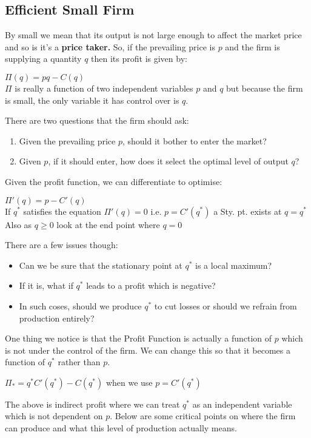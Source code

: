 \documentclass[12pt, letterpaper]{article}
\begin{document}
\subsection{Efficient Small Firm}
By small we mean that its output is not large enough to affect the market price and so is it's a \textbf{price taker.} So, if the prevailing price is $p$ and the firm is supplying a quantity $q$ then its profit is given by:
\begin{center}
	$\Pi(q) = pq - C(q)$\\
	$\Pi$ is really a function of two independent variables $p$ and $q$ but because the firm is small, the only variable it has control over is $q$.
\end{center}
There are two questions that the firm should ask:
\begin{enumerate}
	\item Given the prevailing price $p$, should it bother to enter the market?
	\item Given $p$, if it should enter, how does it select the optimal level of output $q$?
\end{enumerate}
Given the profit function, we can differentiate to optimise:
\begin{center}
	$\Pi'(q) = p - C'(q)$\\
	If $q^*$ satisfies the equation $\Pi'(q)=0$ i.e. $p=C'(q^*)$ a Sty. pt. exists at $q=q^*$\\
	Also as $q \geq0$ look at the end point where $q=0$
\end{center}
There are a few issues though:
\begin{itemize}
	\item Can we be sure that the stationary point at $q^*$ is a local maximum?
	\item If it is, what if $q^*$ leads to a profit which is negative?
	\item In such coses, should we produce $q^*$ to cut losses or should we refrain from production entirely?
\end{itemize}
One thing we notice is that the Profit Function is actually a function of $p$ which is not under the control of the firm. We can change this so that it becomes a function of $q^*$ rather than $p$.
\begin{center}
	$\Pi_* = q^*C'(q^*)-C(q^*)$ when we use $p=C'(q^*)$
\end{center}
The above is indirect profit where we can treat $q^*$ as an independent variable which is not dependent on $p$. Below are some critical points on where the firm can produce and what this level of production actually means.
\end{document}
